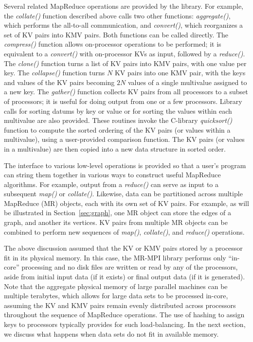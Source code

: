 Several related MapReduce operations are provided by the library.  For
example, the {\it collate()} function described above calls two other
functions: {\it aggregate()}, which performs the all-to-all
communication, and {\it convert()}, which reorganizes a set of KV
pairs into KMV pairs.  Both functions can be called directly.  The
{\it compress()} function allows on-processor operations to be
performed; it is equivalent to a {\it convert()} with on-processor KVs
as input, followed by a {\it reduce()}.  The {\it clone()} function
turns a list of KV pairs into KMV pairs, with one value per key.  The
{\it collapse()} function turns $N$ KV pairs into one KMV pair, with
the keys and values of the KV pairs becoming $2N$ values of a single
multivalue assigned to a new key.  The {\it gather()} function
collects KV pairs from all processors to a subset of processors; it is
useful for doing output from one or a few processors.  Library calls
for sorting datums by key or value or for sorting the values within
each multivalue are also provided.  These routines invoke the
C-library {\it quicksort()} function to compute the sorted ordering of
the KV pairs (or values within a multivalue), using a user-provided
comparison function.  The KV pairs (or values in a multivalue) are
then copied into a new data structure in sorted order.

The interface to various low-level operations is provided so that a
user's program can string them together in various ways to construct
useful MapReduce algorithms.  For example, output from a {\it
reduce()} can serve as input to a subsequent {\it map()} or {\it
collate()}.  Likewise, data can be partitioned across multiple
MapReduce (MR) objects, each with its own set of KV pairs.  For
example, as will be illustrated in Section~\ref{sec:graph}, one MR
object can store the edges of a graph, and another its vertices.  KV
pairs from multiple MR objects can be combined to perform new
sequences of {\it map()}, {\it collate()}, and {\it reduce()}
operations.

The above discussion assumed that the KV or KMV pairs stored by a
processor fit in its physical memory.  In this case, the MR-MPI
library performs only ``in-core'' processing and no disk files are
written or read by any of the processors, aside from initial input
data (if it exists) or final output data (if it is generated).  Note
that the aggregate physical memory of large parallel machines can be
multiple terabytes, which allows for large data sets to be processed
in-core, assuming the KV and KMV pairs remain evenly distributed
across processors throughout the sequence of MapReduce operations.
The use of hashing to assign keys to processors typically provides for
such load-balancing.  In the next section, we discuss what happens
when data sets do not fit in available memory.
